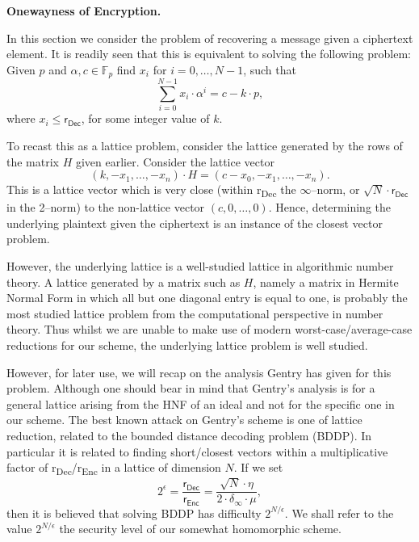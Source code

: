 \documentclass[a4paper, 12pt]{article}
\newcommand{\ndash}{\nobreakdash --}
\newcommand{\bb}[1]{\mathbb{#1}}
\newcommand{\tsf}[1]{\textsf{#1}}
\newcommand{\tbf}[1]{\textbf{#1}}
\newcommand{\tss}[1]{\textsubscript{#1}}
\newenvironment{bparagraph}[1]{
	\vspace{2ex}\noindent\tbf{#1. }\nolinebreak 
}{\vspace{2ex}}
\begin{document}
	\begin{bparagraph}{Onewayness of Encryption}
		In this section we consider the problem of recovering a message given a ciphertext element.
		It is readily seen that this is	equivalent to solving the following problem: Given $p$ and $\alpha, c \in \bb{F}_p $ find $x_i$ for $i = 0,\dots, N - 1$, such that
		\[
		\sum_{i=0}^{N - 1}{x_i \cdot \alpha^i} = c - k \cdot p,
		\]
		where $x_i \leqslant \tsf{r}_\tsf{Dec}$, for some integer value of $k$.
		
		To recast this as a lattice problem, consider the lattice generated by the rows of the matrix $H$ given earlier.
		Consider the lattice vector
		\[
		(k, -x_1,\dots, -x_n) \cdot H = (c-x_0, -x_1,\dots, -x_n).
		\]
		This is a lattice vector which is very close (within \tsf{r\tss{Dec}} the $\infty$\ndash norm, or $\sqrt{N} \cdot \tsf{r}_\tsf{Dec}$ in the 2\ndash norm) to the non-lattice vector $(c, 0,\dots, 0)$. Hence, determining the underlying plaintext given the ciphertext is an instance of the closest vector problem.
		
		However, the underlying lattice is a well-studied lattice in algorithmic number theory.
		A lattice generated by a matrix such as $H$, namely a matrix in Hermite Normal Form in which all but one diagonal entry is equal to one, is probably the most studied	lattice problem from the computational perspective in number theory.
		Thus whilst we are unable to make use of modern worst-case/average-case reductions for our scheme, the underlying lattice problem is well studied.
		
		However, for later use, we will recap on the analysis Gentry has given for this problem. 
		Although one should bear in mind that Gentry's analysis is for a general lattice arising from the HNF of an ideal and not for the specific one in our
		scheme.
		The best known attack on Gentry's scheme is one of lattice reduction, related to the bounded distance decoding problem (BDDP). 
		In particular it is	related to finding short/closest vectors within a multiplicative factor of \tsf{r\tss{Dec}/r\tss{Enc}} in a lattice of dimension $N$. If we set
		\[
		2^\epsilon = \frac{\tsf{r}_\tsf{Dec}}{\tsf{r}_\tsf{Enc}} = \frac{\sqrt{N} \cdot \eta}{2 \cdot \delta_\infty \cdot \mu},
		\]
		then it is believed that solving BDDP has difficulty $2^{N/\epsilon}$.
		We shall refer to the value $2^{N/\epsilon}$ the security level of our somewhat homomorphic scheme.
	\end{bparagraph}
	
\end{document}
